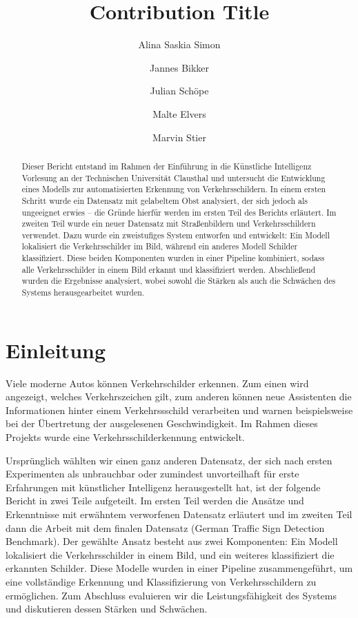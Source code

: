 \documentclass[runningheads]{llncs}
\begin{document}
%
\title{Contribution Title}
%
%
\author{Alina Saskia Simon \and
Jannes Bikker \and
Julian Schöpe \and
Malte Elvers \and
Marvin Stier}
%
%
%
\maketitle              %
%
\begin{abstract}
Dieser Bericht entstand im Rahmen der Einführung in die Künstliche Intelligenz Vorlesung an der Technischen Universität Clausthal und untersucht die Entwicklung eines Modells zur automatisierten Erkennung von Verkehrsschildern. In einem ersten Schritt wurde ein Datensatz mit gelabeltem Obst analysiert, der sich jedoch als ungeeignet erwies – die Gründe hierfür werden im ersten Teil des Berichts erläutert. Im zweiten Teil wurde ein neuer Datensatz mit Straßenbildern und Verkehrsschildern verwendet. Dazu wurde ein  zweistufiges System entworfen und entwickelt: Ein Modell lokalisiert die Verkehrsschilder im Bild, während ein anderes Modell Schilder klassifiziert. Diese beiden Komponenten wurden in einer Pipeline kombiniert, sodass alle Verkehrsschilder in einem Bild erkannt und klassifiziert werden. Abschließend wurden die Ergebnisse analysiert, wobei sowohl die Stärken als auch die Schwächen des Systems herausgearbeitet wurden.

\end{abstract}
%
%
%
\section{Einleitung}
Viele moderne Autos können Verkehrschilder erkennen. Zum einen wird angezeigt, welches Verkehrszeichen gilt, zum anderen können neue Assistenten die Informationen hinter einem Verkehrssschild verarbeiten und warnen beispielsweise bei der Übertretung der ausgelesenen Geschwindigkeit. 
Im Rahmen dieses Projekts wurde eine Verkehrsschilderkennung entwickelt. 

Ursprünglich wählten wir einen ganz anderen Datensatz, der sich nach ersten Experimenten als unbrauchbar oder zumindest unvorteilhaft für erste Erfahrungen mit künstlicher Intelligenz herausgestellt hat, ist der folgende Bericht in zwei Teile aufgeteilt. Im ersten Teil werden die Ansätze und Erkenntnisse mit erwähntem verworfenen Datensatz erläutert und im zweiten Teil dann die Arbeit mit dem finalen Datensatz (German Traffic Sign Detection Benchmark).
Der gewählte Ansatz besteht aus zwei Komponenten: Ein Modell lokalisiert die Verkehrsschilder in einem Bild, und ein weiteres klassifiziert die erkannten Schilder. Diese Modelle wurden in einer Pipeline zusammengeführt, um eine vollständige Erkennung und Klassifizierung von Verkehrsschildern zu ermöglichen. Zum Abschluss evaluieren wir die Leistungsfähigkeit des Systems und diskutieren dessen Stärken und Schwächen.
\end{document}

